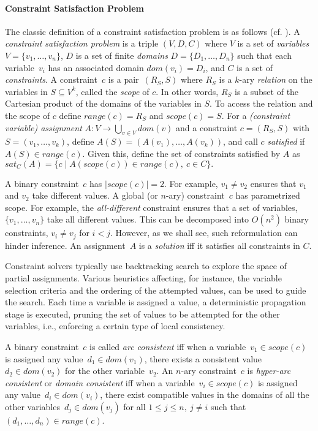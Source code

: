 \documentclass[letterpaper]{article}
\newcommand{\cassignment}{A}
\newcommand{\domain}[1]{dom(#1)}
\newcommand{\range}[1]{range(#1)}
\newcommand{\scope}[1]{scope(#1)}
\newcommand{\citeay}[1]{\citeauthor{#1} \citeyear{#1}}
\begin{document}
\paragraph{Constraint Satisfaction Problem}
The classic definition of a constraint satisfaction problem is as follows (cf. \citeay{robewa06a}). A \emph{constraint satisfaction problem} is a triple $(V,D,C)$ where $V$ is a set of \emph{variables} $V = \{v_1, \dots , v_n\}$, $D$ is a set of finite \emph{domains} $D=\{D_1, \dots , D_n\}$ such that each variable~$v_i$ has an associated domain $\domain{v_i} = D_i$, and $C$ is a set of \emph{constraints}. A constraint~$c$ is a pair~$(R_S,S)$ where $R_S$ is a $k$-ary \emph{relation} on the variables in $S \subseteq V^k$, called the \emph{scope} of $c$. In other words, $R_S$ is a subset of the Cartesian product of the domains of the variables in $S$. To access the relation and the scope of $c$ define $\range{c} = R_S$ and $\scope{c} = S$. For a \emph{(constraint variable) assignment} $\cassignment : V \to \bigcup_{v \in V} dom(v)$ and a constraint $c = (R_S, S)$ with $S = (v_1, \dots, v_k)$, define $\cassignment(S) = (\cassignment(v_1), \dots, \cassignment(v_k))$, and call $c$ \emph{satisfied} if $\cassignment(S) \in \range{c}$. Given this, define the set of constraints satisfied by $\cassignment$ as
$
sat_C(\cassignment) = \{ c \mid \cassignment(\scope{c}) \in \range{c},\ c \in C\}.
$

A binary constraint~$c$ has $|scope(c)|=2$. For example,
$v_1 \neq v_2$ ensures that $v_1$ and $v_2$ take different
values. A global (or $n$-ary) constraint~$c$ has parametrized
scope. For example, 
the \emph{all-different} constraint ensures that
a set of variables, $\{v_1,\ldots,v_n\}$ take all different values. 
This can be decomposed into $O(n^2)$ binary
constraints, $v_i \neq v_j$ for $i<j$. However, as 
we shall see, such reformulation can hinder inference. 
An assignment~$\cassignment$ is a \emph{solution} iff it satisfies all constraints in $C$.

Constraint solvers typically use backtracking search to explore the space of partial assignments. Various heuristics affecting, for instance, the variable selection criteria and the ordering of the attempted values, can be used to guide the search. Each time a variable is assigned a value, a deterministic propagation stage is executed, pruning the set of values to be attempted for the other variables, i.e., enforcing a certain type of local consistency.

A binary constraint~$c$ is called \emph{arc consistent} iff when a variable~$v_1 \in \scope{c}$ is assigned any value~$d_1 \in \domain{v_1}$, there exists a consistent value~$d_2 \in \domain{v_2}$ for the other variable~$v_2$.
An $n$-ary constraint~$c$ is \emph{hyper-arc consistent} or \emph{domain consistent} iff when a variable~$v_i \in \scope{c}$ is assigned any value~$d_i \in \domain{v_i}$, there exist compatible values in the domains of all the other variables~$d_j \in \domain{v_j}$ for all $1 \leq j \leq n,\ j \neq i$ such that $(d_1, \dots, d_n) \in \range{c}$.
\end{document}

